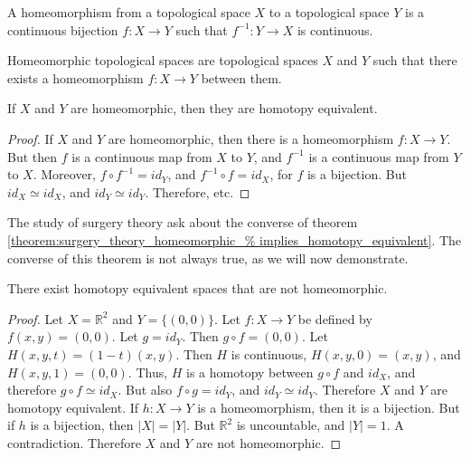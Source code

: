 \documentclass[crop=false,class=book,oneside]{standalone}
\begin{document}
            \begin{definition}
                A homeomorphism from a topological space $X$ to a
                topological space $Y$ is a continuous bijection
                $f:{X}\rightarrow{Y}$ such that
                $f^{-1}:{Y}\rightarrow{X}$ is continuous.
            \end{definition}
            \begin{definition}
                Homeomorphic topological spaces are topological
                spaces $X$ and $Y$ such that there
                exists a homeomorphism
                $f:{X}\rightarrow{Y}$ between them.
            \end{definition}
            \begin{theorem}
                \label{theorem:surgery_theory_homeomorphic_%
                       implies_homotopy_equivalent}
                If $X$ and $Y$ are homeomorphic, then they
                are homotopy equivalent.
            \end{theorem}
            \begin{proof}
                If $X$ and $Y$ are homeomorphic, then there is a
                homeomorphism $f:X\rightarrow Y$. But then $f$ is a
                continuous map from $X$ to $Y$, and $f^{-1}$ is a
                continuous map from $Y$ to $X$. Moreover,
                ${f}\circ{f^{-1}}=id_{Y}$, and
                ${f^{-1}}\circ{f}=id_{X}$,
                for $f$ is a bijection. But
                ${id_{X}}\simeq{id_{X}}$,
                and ${id_{Y}}\simeq{id_{Y}}$. Therefore, etc.
            \end{proof}
            The study of surgery theory ask about the
            converse of theorem
            \ref{theorem:surgery_theory_homeomorphic_%
                 implies_homotopy_equivalent}.
            The converse of this theorem is not always true,
            as we will now demonstrate.
            \begin{theorem}
                \label{theorem:surgery_theory_homotopic_does_%
                       not_imply_homeomorphic}
                There exist homotopy equivalent spaces
                that are not homeomorphic.
            \end{theorem}
            \begin{proof}
                Let $X=\mathbb{R}^{2}$ and $Y=\{(0,0)\}$.
                Let $f:{X}\rightarrow{Y}$ be defined by
                $f(x,y)=(0,0)$. Let $g=id_{Y}$. Then
                $g\circ{f}=(0,0)$. Let $H(x,y,t)=(1-t)(x,y)$.
                Then $H$ is continuous, $H(x,y,0)=(x,y)$,
                and $H(x,y,1)=(0,0)$. Thus, $H$ is a
                homotopy between ${g}\circ{f}$ and $id_{X}$, and
                therefore ${g}\circ{f}\simeq{id_{X}}$. But also
                ${f}\circ{g}=id_{Y}$, and
                ${id_{Y}}\simeq{id_{Y}}$.
                Therefore $X$ and $Y$ are homotopy equivalent.
                If $h:{X}\rightarrow{Y}$ is a
                homeomorphism, then it is a bijection. But if $h$
                is a bijection, then $|X|=|Y|$. But
                $\mathbb{R}^{2}$ is uncountable, and $|Y|=1$. A
                contradiction. Therefore $X$ and $Y$ are
                not homeomorphic.
            \end{proof}
\end{document}
